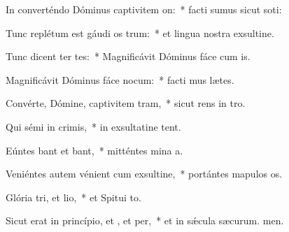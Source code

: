 \item In converténdo Dóminus captivitem on:~* facti sumus sicut soti:
\item Tunc replétum est gáudi os trum:~* et lingua nostra exsultine.
\item Tunc dicent ter tes:~* Magnificávit Dóminus fáce cum is.
\item Magnificávit Dóminus fáce nocum:~* facti mus lætes.
\item Convérte, Dómine, captivitem tram,~* sicut rens in tro.
\item Qui sémi in crimis,~* in exsultatine tent.
\item Eúntes bant et bant,~* mitténtes mina a.
\item Veniéntes autem vénient cum exsultine,~* portántes mapulos os.
\item Glória tri, et lio,~* et Spitui to.
\item Sicut erat in princípio, et , et per,~* et in sǽcula sæcurum. men.
